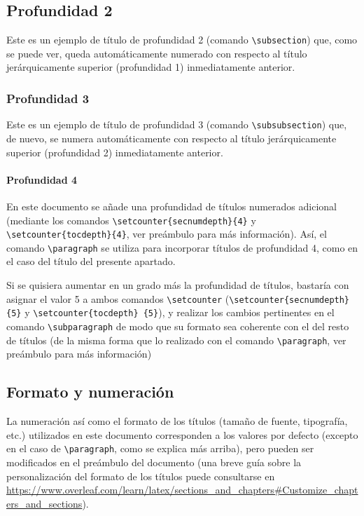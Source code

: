 \documentclass[a4paper, 11pt, spanish, twoside]{article}
\begin{document}
\subsection{Profundidad 2}

Este es un ejemplo de título de profundidad 2 (comando \texttt{\textbackslash subsection}) que, como se puede ver, queda automáticamente numerado con respecto al título jerárquicamente superior (profundidad 1) inmediatamente anterior.


\subsubsection{Profundidad 3}

Este es un ejemplo de título de profundidad 3 (comando \texttt{\textbackslash subsubsection}) que, de nuevo, se numera automáticamente con respecto al título jerárquicamente superior (profundidad 2) inmediatamente anterior.


\paragraph{Profundidad 4}

En este documento se añade una profundidad de títulos numerados adicional (mediante los comandos \texttt{\textbackslash setcounter\{secnumdepth\}\{4\}} y \texttt{\textbackslash setcounter\{tocdepth\}\{4\}}, ver preámbulo para más información). Así, el comando \texttt{\textbackslash paragraph} se utiliza para incorporar títulos de profundidad 4, como en el caso del título del presente apartado. 

Si se quisiera aumentar en un grado más la profundidad de títulos, bastaría con asignar el valor 5 a ambos comandos \texttt{\textbackslash setcounter} (\texttt{\textbackslash setcounter\{secnumdepth\}\{5\}} y \texttt{\textbackslash setcounter\{tocdepth\} \{5\}}), y realizar los cambios pertinentes en el comando \texttt{\textbackslash subparagraph} de modo que su formato sea coherente con el del resto de títulos (de la misma forma que lo realizado con el comando \texttt{\textbackslash paragraph}, ver preámbulo para más información)


\subsection{Formato y numeración}

La numeración así como el formato de los títulos (tamaño de fuente, tipografía, etc.) utilizados en este documento corresponden a los valores por defecto (excepto en el caso de \texttt{\textbackslash paragraph}, como se explica más arriba), pero pueden ser modificados en el preámbulo del documento (una breve guía sobre la personalización del formato de los títulos puede consultarse en \url{https://www.overleaf.com/learn/latex/sections_and_chapters#Customize_chapters_and_sections}). 
\end{document}

